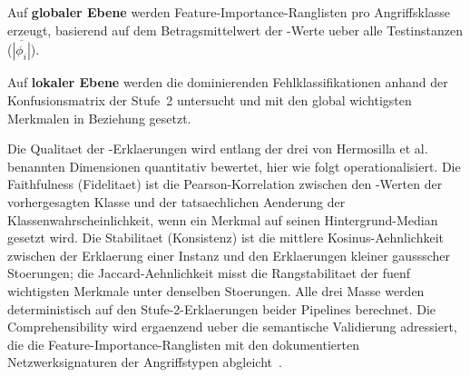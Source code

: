 Auf \textbf{globaler Ebene} werden Feature-Importance-Ranglisten pro Angriffsklasse erzeugt,
basierend auf dem Betragsmittelwert der \shap{}-Werte ueber alle Testinstanzen
($\overline{|\phi_i|}$).

Auf \textbf{lokaler Ebene} werden die dominierenden Fehlklassifikationen anhand der
Konfusionsmatrix der Stufe~2 untersucht und mit den global wichtigsten Merkmalen in Beziehung
gesetzt.

Die Qualitaet der \shap{}-Erklaerungen wird entlang der drei von Hermosilla et al.\
\cite{hermosilla2025xai_forensic} benannten Dimensionen quantitativ bewertet, hier wie folgt
operationalisiert.
Die Faithfulness (Fidelitaet) ist die Pearson-Korrelation zwischen den \shap{}-Werten der
vorhergesagten Klasse und der tatsaechlichen Aenderung der Klassenwahrscheinlichkeit, wenn ein
Merkmal auf seinen Hintergrund-Median gesetzt wird.
Die Stabilitaet (Konsistenz) ist die mittlere Kosinus-Aehnlichkeit zwischen der Erklaerung einer
Instanz und den Erklaerungen kleiner gaussscher Stoerungen; die Jaccard-Aehnlichkeit misst die
Rangstabilitaet der fuenf wichtigsten Merkmale unter denselben Stoerungen.
Alle drei Masse werden deterministisch auf den Stufe-2-Erklaerungen beider Pipelines berechnet.
Die Comprehensibility wird ergaenzend ueber die semantische Validierung adressiert, die die
Feature-Importance-Ranglisten mit den dokumentierten Netzwerksignaturen der Angriffstypen
abgleicht~\cite{neto2023ciciot2023}.
